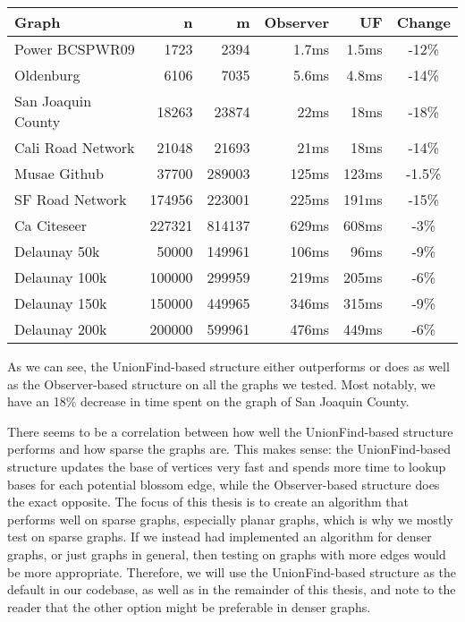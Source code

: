 \begin{center}
    \begin{tabular}{|l | r | r | r | r | c|} 
        \hline
        Graph & n & m & Observer & UF & Change \\ [0.5ex] 
        \hline\hline
        Power BCSPWR09 \cite{graph:bcspwr09-ca-citeseer} & 1723 & 2394 & 1.7ms & 1.5ms & -12\% \\
        \hline
        Oldenburg \cite{graph:oldenburg-sf-cal-san-roads-etc} & 6106 & 7035 & 5.6ms & 4.8ms & -14\%\\ 
        \hline
        San Joaquin County \cite{graph:oldenburg-sf-cal-san-roads-etc} & 18263 & 23874 & 22ms & 18ms & -18\%\\
        \hline
        Cali Road Network \cite{graph:oldenburg-sf-cal-san-roads-etc} & 21048 & 21693 & 21ms & 18ms & -14\%\\
        \hline
        Musae Github \cite{graph:musae-github} & 37700 & 289003 & 125ms & 123ms & -1.5\%\\
        \hline
        SF Road Network \cite{graph:oldenburg-sf-cal-san-roads-etc} & 174956 & 223001 & 225ms & 191ms & -15\%\\
        \hline
        Ca Citeseer \cite{graph:bcspwr09-ca-citeseer} & 227321 & 814137 & 629ms & 608ms & -3\%\\
        \hline
        \hline
        Delaunay 50k & 50000 & 149961 & 106ms & 96ms & -9\%\\
        \hline
        Delaunay 100k & 100000 & 299959 & 219ms & 205ms & -6\%\\
        \hline
        Delaunay 150k & 150000 & 449965 & 346ms & 315ms & -9\%\\
        \hline
        Delaunay 200k & 200000 & 599961 & 476ms & 449ms & -6\%\\
        \hline
    \end{tabular}
\end{center}

As we can see, the UnionFind-based structure either outperforms or does as well as the Observer-based structure on all the graphs we tested. Most notably, we have an 18\% decrease in time spent on the graph of San Joaquin County. 

There seems to be a correlation between how well the UnionFind-based structure performs and how sparse the graphs are. This makes sense: the UnionFind-based structure updates the base of vertices very fast and spends more time to lookup bases for each potential blossom edge, while the Observer-based structure does the exact opposite. The focus of this thesis is to create an algorithm that performs well on sparse graphs, especially planar graphs, which is why we mostly test on sparse graphs. If we instead had implemented an algorithm for denser graphs, or just graphs in general, then testing on graphs with more edges would be more appropriate. Therefore, we will use the UnionFind-based structure as the default in our codebase, as well as in the remainder of this thesis, and note to the reader that the other option might be preferable in denser graphs.

